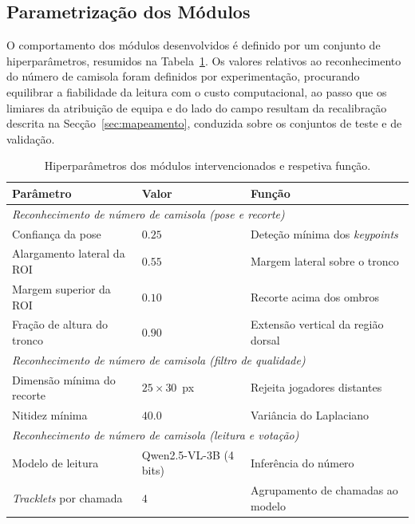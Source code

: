 \subsection{Parametrização dos Módulos}

O comportamento dos módulos desenvolvidos é definido por um conjunto de hiperparâmetros, resumidos na
Tabela~\ref{tab:hiperparametros}. Os valores relativos ao reconhecimento do número de camisola foram
definidos por experimentação, procurando equilibrar a fiabilidade da leitura com o custo
computacional, ao passo que os limiares da atribuição de equipa e do lado do campo resultam da
recalibração descrita na Secção~\ref{sec:mapeamento}, conduzida sobre os conjuntos de teste e de
validação.


\begin{table}[htbp]
    \centering
    \caption{Hiperparâmetros dos módulos intervencionados e respetiva função.}
    \label{tab:hiperparametros}
    \begin{tabular}{lll}
        \hline
        \textbf{Parâmetro} & \textbf{Valor} & \textbf{Função} \\
        \hline
        \multicolumn{3}{l}{\emph{Reconhecimento de número de camisola (pose e recorte)}} \\
        Confiança da pose            & $0.25$          & Deteção mínima dos \emph{keypoints} \\
        Alargamento lateral da ROI   & $0.55$          & Margem lateral sobre o tronco \\
        Margem superior da ROI       & $0.10$          & Recorte acima dos ombros \\
        Fração de altura do tronco   & $0.90$          & Extensão vertical da região dorsal \\
        \hline
        \multicolumn{3}{l}{\emph{Reconhecimento de número de camisola (filtro de qualidade)}} \\
        Dimensão mínima do recorte   & $25\times30$~px & Rejeita jogadores distantes \\
        Nitidez mínima               & $40.0$          & Variância do Laplaciano \\
        \hline
        \multicolumn{3}{l}{\emph{Reconhecimento de número de camisola (leitura e votação)}} \\
        Modelo de leitura            & Qwen2.5-VL-3B (4 bits) & Inferência do número \\
        \emph{Tracklets} por chamada & $4$             & Agrupamento de chamadas ao modelo \\

\end{tabular}
\end{table}
